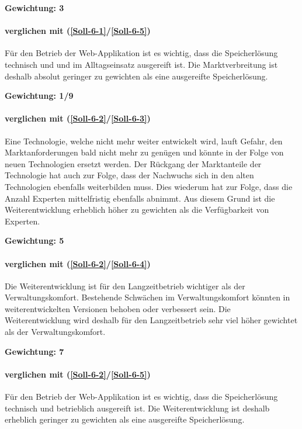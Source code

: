 \textbf{Gewichtung: 3}

\paragraph*{ verglichen mit  (\ref{Soll-6-1}/\ref{Soll-6-5})}
Für den Betrieb der Web-Applikation ist es wichtig, dass die Speicherlösung technisch und und im Alltagseinsatz ausgereift ist. Die Marktverbreitung ist deshalb absolut geringer zu gewichten als eine ausgereifte Speicherlösung.

\textbf{Gewichtung: 1/9}

\paragraph*{ verglichen mit  (\ref{Soll-6-2}/\ref{Soll-6-3})}
Eine Technologie, welche nicht mehr weiter entwickelt wird, lauft Gefahr, den Marktanforderungen bald nicht mehr zu genügen und könnte in der Folge von neuen Technologien ersetzt werden. Der Rückgang der Marktanteile der Technologie hat auch zur Folge, dass der Nachwuchs sich in den alten Technologien ebenfalls weiterbilden muss. Dies wiederum hat zur Folge, dass die Anzahl Experten mittelfristig ebenfalls abnimmt. Aus diesem Grund ist die Weiterentwicklung erheblich höher zu gewichten als die Verfügbarkeit von Experten.

\textbf{Gewichtung: 5}

\paragraph*{ verglichen mit  (\ref{Soll-6-2}/\ref{Soll-6-4})}

Die Weiterentwicklung ist für den Langzeitbetrieb wichtiger als der Verwaltungskomfort. Bestehende Schwächen im Verwaltungskomfort könnten in weiterentwickelten Versionen behoben oder verbessert sein. Die Weiterentwicklung wird deshalb für den Langzeitbetrieb sehr viel höher gewichtet als der Verwaltungskomfort.

\textbf{Gewichtung: 7}

\paragraph*{ verglichen mit  (\ref{Soll-6-2}/\ref{Soll-6-5})}
Für den Betrieb der Web-Applikation ist es wichtig, dass die Speicherlösung technisch und betrieblich ausgereift ist. Die Weiterentwicklung ist deshalb erheblich geringer zu gewichten als eine ausgereifte Speicherlösung.

